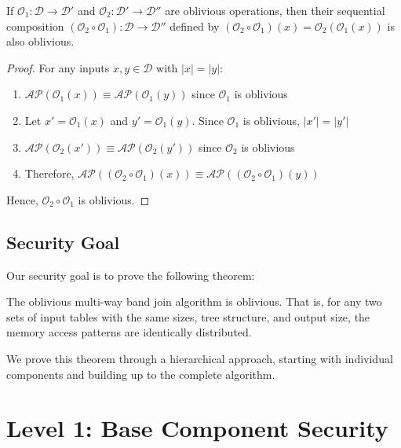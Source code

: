 \begin{theorem}
\label{thm:composition}
If $\mathcal{O}_1: \mathcal{D} \rightarrow \mathcal{D}'$ and $\mathcal{O}_2: \mathcal{D}' \rightarrow \mathcal{D}''$ are oblivious operations, then their sequential composition $(\mathcal{O}_2 \circ \mathcal{O}_1): \mathcal{D} \rightarrow \mathcal{D}''$ defined by $(\mathcal{O}_2 \circ \mathcal{O}_1)(x) = \mathcal{O}_2(\mathcal{O}_1(x))$ is also oblivious.
\end{theorem}

\begin{proof}
For any inputs $x, y \in \mathcal{D}$ with $|x| = |y|$:
\begin{enumerate}
\item $\mathcal{AP}(\mathcal{O}_1(x)) \equiv \mathcal{AP}(\mathcal{O}_1(y))$ since $\mathcal{O}_1$ is oblivious
\item Let $x' = \mathcal{O}_1(x)$ and $y' = \mathcal{O}_1(y)$. Since $\mathcal{O}_1$ is oblivious, $|x'| = |y'|$
\item $\mathcal{AP}(\mathcal{O}_2(x')) \equiv \mathcal{AP}(\mathcal{O}_2(y'))$ since $\mathcal{O}_2$ is oblivious
\item Therefore, $\mathcal{AP}((\mathcal{O}_2 \circ \mathcal{O}_1)(x)) \equiv \mathcal{AP}((\mathcal{O}_2 \circ \mathcal{O}_1)(y))$
\end{enumerate}
Hence, $\mathcal{O}_2 \circ \mathcal{O}_1$ is oblivious.
\end{proof}

\subsection{Security Goal}

Our security goal is to prove the following theorem:

\begin{theorem}
\label{thm:main-security}
The oblivious multi-way band join algorithm is oblivious. That is, for any two sets of input tables with the same sizes, tree structure, and output size, the memory access patterns are identically distributed.
\end{theorem}

We prove this theorem through a hierarchical approach, starting with individual components and building up to the complete algorithm.

\section{Level 1: Base Component Security}

